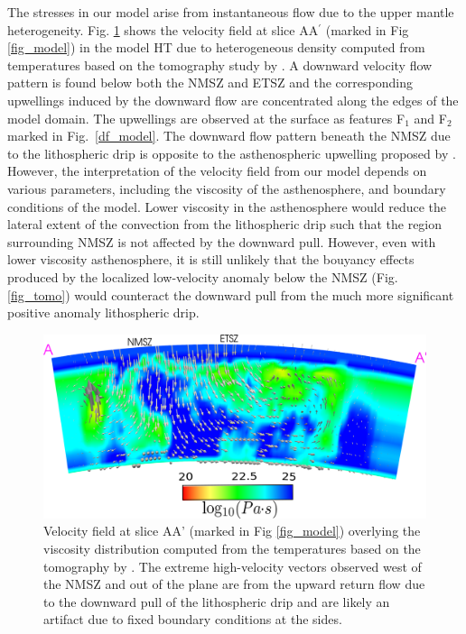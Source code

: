\documentclass[draft,linenumbers]{agujournal2018}
\begin{document}
    The stresses in our model arise from instantaneous flow due to the upper mantle heterogeneity. Fig. \ref{velocity_pattern} shows the velocity field at slice AA$^{\prime}$ (marked in Fig \ref{fig_model}) in the model HT due to heterogeneous density computed from temperatures based on the tomography study by \citet{Biryol_2016}. A downward velocity flow pattern is found below both the NMSZ and ETSZ and the corresponding upwellings induced by the downward flow are concentrated along the edges of the model domain. The upwellings are observed at the surface as features F$_1$ and F$_2$ marked in Fig.~\ref{df_model}. The downward flow pattern beneath the NMSZ due to the lithospheric drip is opposite to the asthenospheric upwelling proposed by \citet{Biryol_2016}. However, the interpretation of the velocity field from our model depends on various parameters, including the viscosity of the asthenosphere, and boundary conditions of the model. %
    Lower viscosity in the asthenosphere would reduce the lateral extent of the convection from the lithospheric drip such that the region surrounding NMSZ is not affected by the downward pull. However, even with lower viscosity asthenosphere, it is still unlikely that the bouyancy effects produced by the localized low-velocity anomaly below the NMSZ (Fig. \ref{fig_tomo}) would counteract the downward pull from the much more significant positive anomaly lithospheric drip. 
    
\begin{figure}[ht]
    \centering
    \includegraphics[width=0.9\linewidth]{figures/velocity_pattern.png}
    \caption{Velocity field at slice AA' (marked in Fig \ref{fig_model}) overlying the viscosity distribution computed from the temperatures based on the tomography by \citet{Biryol_2016}. The extreme high-velocity vectors observed west of the NMSZ and out of the plane are from the upward return flow due to the downward pull of the lithospheric drip and are likely an artifact due to fixed boundary conditions at the sides.}
    \label{velocity_pattern}
\end{figure}    
    
\end{document}
